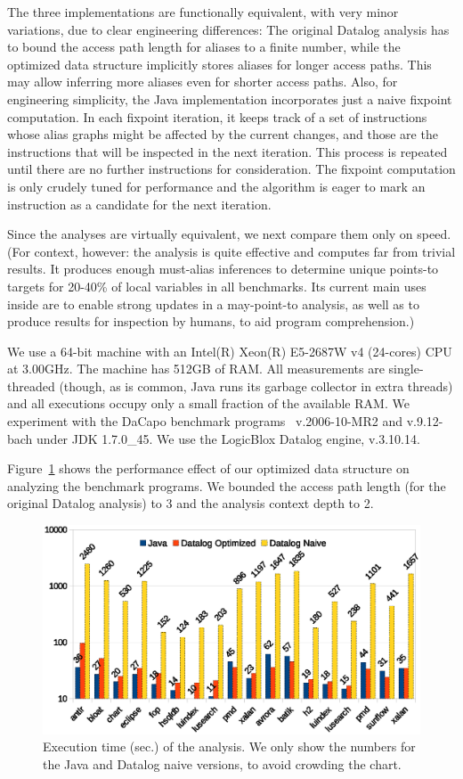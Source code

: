 The three implementations are functionally equivalent, with very minor variations, due to clear engineering differences: The original Datalog analysis has to bound the access path length for aliases to a finite number, while the optimized data structure implicitly stores aliases for longer access paths. This may allow inferring more aliases even for shorter access paths. Also, for engineering simplicity, the Java implementation incorporates just a naive fixpoint computation. In each fixpoint iteration, it keeps track of a set of instructions whose alias graphs might be affected by the current changes, and those are the instructions that will be inspected in the next iteration. This process is repeated until there are no further instructions for consideration. The fixpoint computation is only crudely tuned for performance and the algorithm is eager to mark an instruction as a candidate for the next iteration.

Since the analyses are virtually equivalent, we next compare them only on speed. (For context, however: the analysis is quite effective and computes far from trivial results. It produces enough must-alias inferences to determine unique points-to targets for 20-40\% of local variables in all benchmarks. Its current main uses inside \doop{} are to enable strong updates in a may-point-to analysis, as well as to produce results for inspection by humans, to aid program comprehension.)

We use a 64-bit machine with an Intel(R) Xeon(R) E5-2687W v4 (24-cores) CPU at 3.00GHz. The machine has 512GB of RAM. All measurements are single-threaded (though, as is common, Java runs its garbage collector in extra threads) and all executions occupy only a small fraction of the available RAM. We experiment with the DaCapo benchmark programs~\cite{oopsla:2006:Blackburn} v.2006-10-MR2 and v.9.12-bach under JDK 1.7.0\_45.  We use the LogicBlox Datalog engine, v.3.10.14.


Figure~\ref{fig:must-data:time-chart} shows the performance effect of our optimized data structure on analyzing the benchmark programs. We bounded the access path length (for the original Datalog analysis) to 3 and the analysis context depth to 2.

\begin{figure}[htp]
\centering
\includegraphics[clip,width=0.77\linewidth, height=0.4275\linewidth]{assets/must-data/time.eps}
\caption{Execution time (sec.) of the analysis. We only show the numbers for the Java and Datalog naive versions, to avoid crowding the chart.}
\label{fig:must-data:time-chart}
\end{figure}

